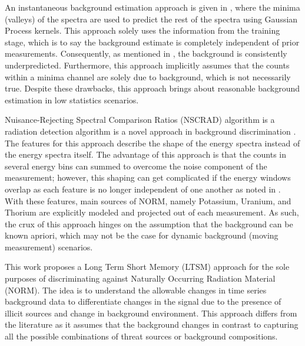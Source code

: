 \documentclass[conference]{IEEEtran}
\begin{document}


An instantaneous background estimation approach is given in \cite{alamaniotis}, where the minima (valleys) of the spectra are used to predict the rest of the spectra using Gaussian Process kernels. This approach solely uses the information from the training stage, which is to say the background estimate is completely independent of prior measurements. Consequently, as mentioned in \cite{alamaniotis}, the background is consistently underpredicted. Furthermore, this approach implicitly assumes that the counts within a minima channel are solely due to background, which is not necessarily true. Despite these drawbacks, this approach brings about reasonable background estimation in low statistics scenarios.

Nuisance-Rejecting Spectral Comparison Ratios (NSCRAD) algorithm is a radiation detection algorithm is a novel approach in background discrimination \cite{detwiler}. The features for this approach describe the shape of the energy spectra instead of the energy spectra itself. The advantage of this approach is that the counts in several energy bins can summed to overcome the noise component of the  measurement; however, this shaping can get complicated if the energy windows overlap as each feature is no longer independent of one another as noted in \cite{detwiler}. With these features, main sources of NORM, namely Potassium, Uranium, and Thorium are explicitly modeled and projected out of each measurement. As such, the crux of this approach hinges on the assumption that the background can be known apriori, which may not be the case for dynamic background (moving measurement) scenarios.


This work proposes a Long Term Short Memory (LTSM) approach for the sole purposes of discriminating against Naturally Occurring Radiation Material (NORM). The idea is to understand the allowable changes in time series background data to differentiate changes in the signal due to the presence of illicit sources and change in background environment. This approach differs from the literature as it assumes that the background changes in contrast to capturing all the possible combinations of threat sources or background compositions.
\end{document}
